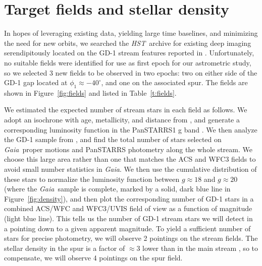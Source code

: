 \documentclass[12pt]{article}
\newcommand{\hst}{\textsl{HST}}
\newcommand{\gaia}{\textsl{Gaia}}
\begin{document}
\section*{Target fields and stellar density}
In hopes of leveraging existing data, yielding large time baselines, and minimizing the need for new orbits, we searched the \hst\ archive for existing deep imaging serendipitously located on the GD-1 stream features reported in \textcite{pwb2018}.
Unfortunately, no suitable fields were identified for use as first epoch for our astrometric study, so we selected 3 new fields to be observed in two epochs: two on either side of the GD-1 gap located at $\phi_1\approx-40^\circ$, and one on the associated spur.
The fields are shown in Figure~\ref{fig:fields} and listed in Table~\ref{t:fields}.

We estimated the expected number of stream stars in each field as follows.
We adopt an isochrone with age, metallicity, and distance from \textcite{koposov2010}, and generate a corresponding luminosity function in the PanSTARRS1 g band \parencite[Figure~\ref{fig:density},][]{dotter2008}.
We then analyze the GD-1 sample from \textcite{pwb2018}, and find the total number of stars selected on \gaia\ proper motions and PanSTARRS photometry along the whole stream.
We choose this large area rather than one that matches the ACS and WFC3 fields to avoid small number statistics in \gaia.
We then use the cumulative distribution of these stars to normalize the luminosity function between $g\approx18$ and $g\approx20$ (where the \gaia\ sample is complete, marked by a solid, dark blue line in Figure~\ref{fig:density}), and then plot the corresponding number of GD-1 stars in a combined ACS/WFC and WFC3/UVIS field of view as a function of magnitude (light blue line).
This tells us the number of GD-1 stream stars we will detect in a pointing down to a given apparent magnitude.
To yield a sufficient number of stars for precise photometry, we will observe 2 pointings on the stream fields.
The stellar density in the spur is a factor of $\approx3$ lower than in the main stream \parencite[compare Figure~5 in][]{pwb2018}, so to compensate, we will observe 4 pointings on the spur field.
\end{document}
